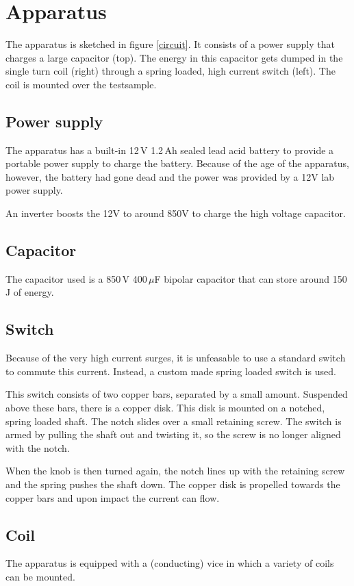 \section{Apparatus}
The apparatus is sketched in figure \ref{circuit}. It consists of a power 
supply that charges a large capacitor (top).  The energy in this capacitor 
gets dumped in the single turn coil (right) through a spring loaded, high 
current switch (left). The coil is mounted over the testsample.


\subsection{Power supply}
The apparatus has a built-in 12\,V 1.2\,Ah sealed lead acid battery to 
provide a portable power supply to charge the battery. Because of the age 
of the apparatus, however, the battery had gone dead and the power was 
provided by a 12V lab power supply.

An inverter boosts the 12V to around 850V to charge the high voltage 
capacitor.

\subsection{Capacitor}
The capacitor used is a 850\,V 400\,$\mu$F bipolar capacitor that can store 
around 150\,J of energy.

\subsection{Switch}
Because of the very high current surges, it is unfeasable to use a standard 
switch to commute this current. Instead, a custom made spring loaded switch 
	is used.

This switch consists of two copper bars, separated by a small amount. 
Suspended above these bars, there is a copper disk. This disk is mounted on 
a notched, spring loaded shaft. The notch slides over a small retaining 
screw. The switch is armed by pulling the shaft out and twisting it, so the 
screw is no longer aligned with the notch.

When the knob is then turned again, the notch lines up with the retaining 
screw and the spring pushes the shaft down. The copper disk is propelled 
towards the copper bars and upon impact the current can flow.

\subsection{Coil}
The apparatus is equipped with a (conducting) vice in which a variety of 
coils can be mounted. 

